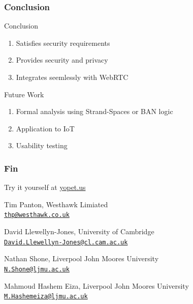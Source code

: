 \documentclass[handout, notes=show]{beamer}
\newcommand{\emaillink}[1]{\href{mailto:#1}{\nolinkurl{#1}}}
\begin{document}
\begin{frame}
\frametitle{Conclusion}
\setlength{\parskip}{0.5em}

Conclusion
\begin{enumerate}
\item Satisfies security requirements
\item Provides security and privacy
\item Integrates seemlessly with WebRTC
\end{enumerate}

Future Work
\begin{enumerate}
\item Formal analysis using Strand-Spaces or BAN logic
\item Application to IoT
\item Usability testing
\end{enumerate}

\end{frame}


\begin{frame}
\frametitle{Fin}
Try it yourself at \url{yopet.us}
\setlength{\parskip}{1.0em}

Tim Panton, Westhawk Limiated \\
\emaillink{thp@westhawk.co.uk}

David Llewellyn-Jones, University of Cambridge \\
\emaillink{David.Llewellyn-Jones@cl.cam.ac.uk}

Nathan Shone, Liverpool John Moores University \\
\emaillink{N.Shone@ljmu.ac.uk}

Mahmoud Hashem Eiza, Liverpool John Moores University \\
\emaillink{M.Hashemeiza@ljmu.ac.uk}

\end{frame}


%
%

\end{document}
